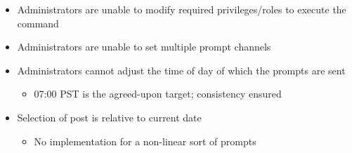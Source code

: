 \documentclass[7px]{article}
\begin{document}
{
  \small
  \begin{itemize}[label=\opentimes]
    \item Administrators are unable to modify required privileges/roles to execute the command
    \item Administrators are unable to set multiple prompt channels
    \item Administrators cannot adjust the time of day of which the prompts are sent 
      \footnotesize{
        \begin{itemize}
          \item 07:00 PST is the agreed-upon target; consistency ensured
        \end{itemize}
      }
    \item Selection of post is relative to current date
      \footnotesize{
        \begin{itemize}
          \item No implementation for a non-linear sort of prompts
        \end{itemize}
      }
  \end{itemize}
  \normalsize
}


\end{document}
